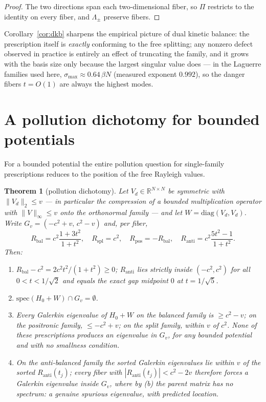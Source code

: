 \documentclass[11pt,reqno]{amsart}
\newtheorem{theorem}{Theorem}[section]
\theoremstyle{definition}
\theoremstyle{remark}
\newcommand{\R}{\mathbb{R}}
\newcommand{\norm}[1]{\lVert #1\rVert}
\begin{document}
\begin{proof}
The two directions span each two-dimensional fiber, so $\Pi$ restricts
to the identity on every fiber, and $\Lambda_{\pm}$ preserve fibers.
\end{proof}

Corollary~\ref{cor:dkb} sharpens the empirical picture of dual kinetic
balance: the prescription itself is \emph{exactly} conforming to the
free splitting; any nonzero defect observed in practice is entirely an
effect of truncating the family, and it grows with the basis size only
because the largest singular value does --- in the Laguerre families
used here, $\sigma_{\max}\approx0.64\,\beta N$ (measured exponent
$0.992$), so the danger fibers $t=O(1)$ are always the highest modes.

\section{A pollution dichotomy for bounded potentials}
\label{sec:dichotomy}

For a bounded potential the entire pollution question for single-family
prescriptions reduces to the position of the free Rayleigh values.

\begin{theorem}[pollution dichotomy]\label{thm:dichotomy}
Let $V_{d}\in\R^{N\times N}$ be symmetric with
$\norm{V_{d}}_{2}\le v$ --- in particular the compression of a bounded
multiplication operator with $\norm{V}_{\infty}\le v$ onto the
orthonormal family --- and let $W=\mathrm{diag}(V_{d},V_{d})$. Write
$G_{v}=(-c^{2}+v,\,c^{2}-v)$ and, per fiber,
\begin{equation}
R_{\mathrm{bal}}=c^{2}\frac{1+3t^{2}}{1+t^{2}},\quad
R_{\mathrm{spl}}=c^{2},\quad
R_{\mathrm{pos}}=-R_{\mathrm{bal}},\quad
R_{\mathrm{anti}}=c^{2}\frac{5t^{2}-1}{1+t^{2}}.
\label{eq:rayleigh}
\end{equation}
Then:
\begin{enumerate}
\item[(a)] $R_{\mathrm{bal}}-c^{2}=2c^{2}t^{2}/(1+t^{2})\ge0$;
$R_{\mathrm{anti}}$ lies strictly inside $(-c^{2},c^{2})$ for all
$0<t<1/\sqrt{2}$ and equals the exact gap midpoint $0$ at
$t=1/\sqrt{5}$.
\item[(b)] $\mathrm{spec}(H_{0}+W)\cap G_{v}=\emptyset$.
\item[(c)] Every Galerkin eigenvalue of $H_{0}+W$ on the balanced
family is $\ge c^{2}-v$; on the positronic family, $\le -c^{2}+v$; on
the split family, within $v$ of $c^{2}$. None of these prescriptions
produces an eigenvalue in $G_{v}$, for any bounded potential and with
no smallness condition.
\item[(d)] On the anti-balanced family the sorted Galerkin eigenvalues
lie within $v$ of the sorted $R_{\mathrm{anti}}(t_{j})$; every fiber
with $|R_{\mathrm{anti}}(t_{j})|<c^{2}-2v$ therefore forces a Galerkin
eigenvalue inside $G_{v}$, where by (b) the parent matrix has no
spectrum: a genuine spurious eigenvalue, with predicted location.
\end{enumerate}
\end{theorem}
\end{document}
